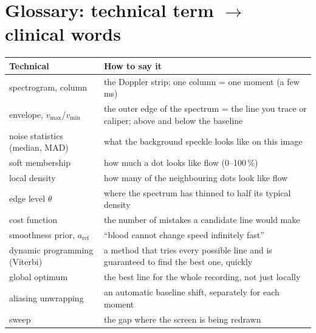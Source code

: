 \documentclass[11pt,a4paper]{article}
\newcommand{\vmax}{v_{\max}}
\newcommand{\vmin}{v_{\min}}
\begin{document}
\section{Glossary: technical term $\to$ clinical words}
\begin{center}\small
\begin{tabularx}{\linewidth}{@{}>{\raggedright\arraybackslash}p{3.8cm}L@{}}
\toprule
Technical & How to say it \\ \midrule
spectrogram, column & the Doppler strip; one column = one moment (a few ms) \\
envelope, $\vmax$/$\vmin$ & the outer edge of the spectrum = the line you trace or caliper; above and below the baseline \\
noise statistics (median, MAD) & what the background speckle looks like on this image \\
soft membership & how much a dot looks like flow (0--100\,\%) \\
local density & how many of the neighbouring dots look like flow \\
edge level $\theta$ & where the spectrum has thinned to half its typical density \\
cost function & the number of mistakes a candidate line would make \\
smoothness prior, $a_{\mathrm{ref}}$ & ``blood cannot change speed infinitely fast'' \\
dynamic programming (Viterbi) & a method that tries every possible line and is guaranteed to find the best one, quickly \\
global optimum & the best line for the whole recording, not just locally \\
aliasing unwrapping & an automatic baseline shift, separately for each moment \\
sweep & the gap where the screen is being redrawn \\
\bottomrule
\end{tabularx}
\end{center}
\end{document}
